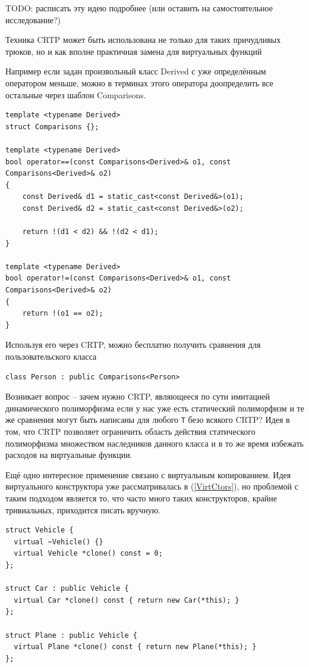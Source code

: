 \documentclass[a4paper,12pt,oneside]{article}
\begin{document}
TODO: расписать эту идею подробнее (или оставить на самостоятельное исследование?)

Техника CRTP может быть использована не только для таких причудливых трюков, но и как вполне практичная замена для виртуальных функций

Например если задан произвольный класс Derived с уже определённым оператором меньше, можно в терминах этого оператора доопределить все остальные через шаблон Comparisons. 

\begin{lstlisting}
template <typename Derived>
struct Comparisons {};

template <typename Derived>
bool operator==(const Comparisons<Derived>& o1, const Comparisons<Derived>& o2)
{
    const Derived& d1 = static_cast<const Derived&>(o1);
    const Derived& d2 = static_cast<const Derived&>(o2);

    return !(d1 < d2) && !(d2 < d1);
}

template <typename Derived>
bool operator!=(const Comparisons<Derived>& o1, const Comparisons<Derived>& o2)
{
    return !(o1 == o2);
}
\end{lstlisting}

Используя его через CRTP, можно бесплатно получить сравнения для пользовательского класса

\begin{lstlisting}
class Person : public Comparisons<Person>
\end{lstlisting}

Возникает вопрос -- зачем нужно CRTP, являющееся по сути имитацией динамического полиморфизма если у нас уже есть статический полиморфизм и те же сравнения могут быть написаны для любого \lstinline!T! безо всякого CRTP? Идея в том, что CRTP позволяет ограничить область действия статического полиморфизма множеством наследников данного класса и в то же время избежать расходов на виртуальные функции.

Ещё одно интересное применение связано с виртуальным копированием. Идея виртуального конструктора уже рассматривалась в (\ref{VirtCtors}), но проблемой с таким подходом является то, что часто много таких конструкторов, крайне тривиальных, приходится писать вручную.

\begin{lstlisting}
struct Vehicle {
  virtual ~Vehicle() {}
  virtual Vehicle *clone() const = 0;
};

struct Car : public Vehicle {
  virtual Car *clone() const { return new Car(*this); }
}; 

struct Plane : public Vehicle {
  virtual Plane *clone() const { return new Plane(*this); }
};
\end{lstlisting}
\end{document}
